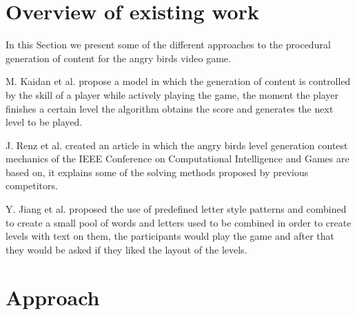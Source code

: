 \documentclass[conference]{IEEEtran}
\begin{document}









\section{Overview of existing work}

In this Section we present some of the different approaches to the procedural
generation of content for the angry birds video game.

M. Kaidan et al. \cite{Kaidan2015} propose a model in which the generation of
content is controlled by the skill of a player while actively playing the game,
the moment the player finishes a certain level the algorithm obtains the score
and generates the next level to be played.

J. Renz et al. \cite{Renz} created an article in which the angry birds level
generation contest mechanics of the IEEE Conference on Computational
Intelligence and Games are based on, it explains some of the solving methods
proposed by previous competitors.

Y. Jiang et al. \cite{Jiang2017} proposed the use of predefined letter style
patterns and combined to create a small pool of words and letters used to be combined in
order to create levels with text on them, the participants would play the game
and after that they would be asked if they liked the layout of the levels.

\section{Approach}
\end{document}
